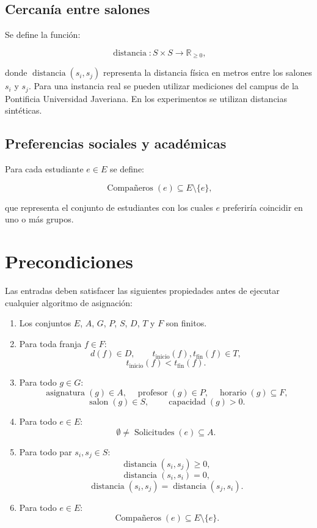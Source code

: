 \documentclass[11pt]{article}
\numberwithin{equation}{section}
\numberwithin{figure}{section}
\numberwithin{table}{section}
\theoremstyle{definition}
\begin{document}
\subsection{Cercanía entre salones}

Se define la función:

\[
\operatorname{distancia}:S\times S\rightarrow\mathbb{R}_{\geq 0},
\]

donde $\operatorname{distancia}(s_i,s_j)$ representa la distancia física en
metros entre los salones $s_i$ y $s_j$. Para una instancia real se pueden
utilizar mediciones del campus de la Pontificia Universidad Javeriana.
En los experimentos se utilizan distancias sintéticas.

\subsection{Preferencias sociales y académicas}

Para cada estudiante $e\in E$ se define:

\[
\operatorname{Compañeros}(e)\subseteq E\setminus\{e\},
\]

que representa el conjunto de estudiantes con los cuales $e$ preferiría
coincidir en uno o más grupos.

\section{Precondiciones}

Las entradas deben satisfacer las siguientes propiedades antes de ejecutar
cualquier algoritmo de asignación:

\begin{enumerate}
  \item Los conjuntos $E$, $A$, $G$, $P$, $S$, $D$, $T$ y $F$ son finitos.
  \item Para toda franja $f\in F$:
        \[
        d(f)\in D,\qquad
        t_{\mathrm{inicio}}(f),t_{\mathrm{fin}}(f)\in T,
        \]
        \[
        t_{\mathrm{inicio}}(f)<t_{\mathrm{fin}}(f).
        \]
  \item Para todo $g\in G$:
        \[
        \operatorname{asignatura}(g)\in A,\quad
        \operatorname{profesor}(g)\in P,\quad
        \operatorname{horario}(g)\subseteq F,
        \]
        \[
        \operatorname{salon}(g)\in S,\qquad
        \operatorname{capacidad}(g)>0.
        \]
  \item Para todo $e\in E$:
        \[
        \emptyset\neq\operatorname{Solicitudes}(e)\subseteq A.
        \]
  \item Para todo par $s_i,s_j\in S$:
        \[
        \operatorname{distancia}(s_i,s_j)\geq 0,
        \]
        \[
        \operatorname{distancia}(s_i,s_i)=0,
        \]
        \[
        \operatorname{distancia}(s_i,s_j)
        =\operatorname{distancia}(s_j,s_i).
        \]
  \item Para todo $e\in E$:
        \[
        \operatorname{Compañeros}(e)\subseteq E\setminus\{e\}.
        \]
\end{enumerate}
\end{document}
